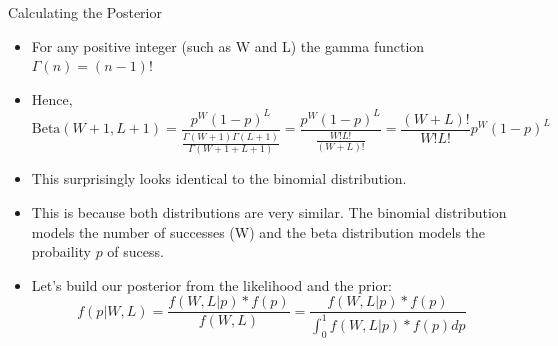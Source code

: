 \documentclass[handout]{beamer}
\begin{document}
\begin{frame}{Calculating the Posterior}
\scriptsize{

\begin{itemize}
\item For any positive integer (such as W and L) the gamma function $\Gamma(n) = (n-1)!$

\item Hence, \begin{displaymath}
\text{Beta}(W+1 , L+1) = \frac{p^W(1-p)^L}{\frac{\Gamma(W+1)\Gamma(L+1)}{\Gamma(W+1 + L+1)}} = \frac{p^W(1-p)^L}{\frac{W!L!}{(W+L)!}} = \frac{(W+L)!}{W!L!}p^W(1-p)^L
\end{displaymath}

\item This surprisingly looks identical to the binomial distribution.

\item This is because both distributions are very similar. The binomial distribution models the number of successes (W) and the beta distribution models the probaility $p$ of sucess. 


\item Let's build our posterior from the likelihood and the prior:
\begin{displaymath}
f(p|W,L) = \frac{f(W,L|p)*f(p)}{f(W,L)} = \frac{f(W,L|p)*f(p)}{\int_0^1f(W,L|p)*f(p)dp} 
\end{displaymath}

\end{itemize}

} 

\end{frame}
\end{document}

